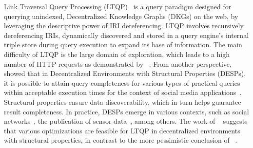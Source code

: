 Link Traversal Query Processing (LTQP)~\cite{Hartig2012} is a query paradigm designed for querying unindexed, Decentralized Knowledge Graphs (DKGs) on the web, by leveraging the descriptive power of IRI dereferencing.
LTQP involves recursively dereferencing IRIs, dynamically discovered and stored in a query engine's internal triple store during query execution to expand its base of information.
The main difficulty of LTQP is the large domain of exploration, which leads to a high number of HTTP requests as demonstrated by \citeauthor{hartig2016walking}~\cite{hartig2016walking}.
From another perspective, \citeauthor{Taelman2023}~\cite{Taelman2023} showed that in Decentralized Environments with Structural Properties (DESPs), it is possible to attain query completeness for various types of practical queries within acceptable execution times for the context of social media applications~\cite{nielsen1993response}.
Structural properties ensure data discoverability, which in turn helps guarantee result completeness.
In practice, DESPs emerge in various contexts, such as social networks~\cite{Taelman2023}, the publication of sensor data~\cite{tam_iswc_traversalsensortree_2024}, among others.
The work of \citeauthor{Taelman2023}~\cite{Taelman2023} suggests that various optimizations are feasible for LTQP in decentralized environments with structural properties, in contrast to the more pessimistic conclusion of \citeauthor{hartig2016walking}~\cite{hartig2016walking}.

